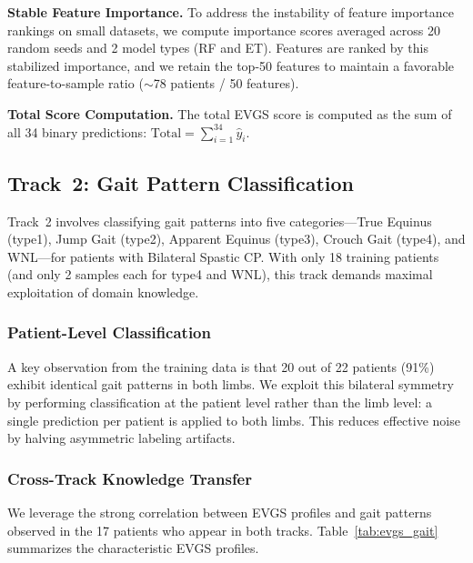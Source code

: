 \noindent\textbf{Stable Feature Importance.}
To address the instability of feature importance rankings on small datasets, we compute importance scores averaged across 20 random seeds and 2 model types (RF and ET). Features are ranked by this stabilized importance, and we retain the top-50 features to maintain a favorable feature-to-sample ratio ($\sim$78 patients / 50 features).

\noindent\textbf{Total Score Computation.}
The total EVGS score is computed as the sum of all 34 binary predictions: $\text{Total} = \sum_{i=1}^{34} \hat{y}_i$.

\subsection{Track~2: Gait Pattern Classification}
\label{sec:track2}

Track~2 involves classifying gait patterns into five categories---True Equinus (type1), Jump Gait (type2), Apparent Equinus (type3), Crouch Gait (type4), and WNL---for patients with Bilateral Spastic CP. With only 18 training patients (and only 2 samples each for type4 and WNL), this track demands maximal exploitation of domain knowledge.

\subsubsection{Patient-Level Classification}
\label{sec:patient_level}

A key observation from the training data is that 20 out of 22 patients (91\%) exhibit identical gait patterns in both limbs. We exploit this bilateral symmetry by performing classification at the patient level rather than the limb level: a single prediction per patient is applied to both limbs. This reduces effective noise by halving asymmetric labeling artifacts.

\subsubsection{Cross-Track Knowledge Transfer}
\label{sec:cross_track}

We leverage the strong correlation between EVGS profiles and gait patterns observed in the 17 patients who appear in both tracks. Table~\ref{tab:evgs_gait} summarizes the characteristic EVGS profiles.

